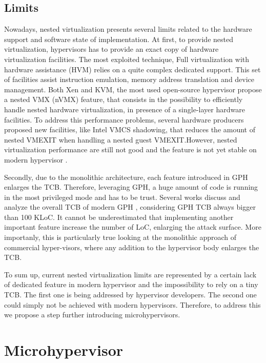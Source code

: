 \documentclass{acm_proc_article-sp} %
\begin{document}
\subsection{Limits}

Nowadays, nested virtualization presents several limits related to the hardware support and software state of implementation. At first, to provide nested virtualization, hypervisors has to provide an exact copy of hardware virtualization facilities. The most exploited technique, Full virtualization with hardware assistance (HVM) relies on a quite complex dedicated support.
This set of facilities assist instruction emulation, memory address translation and device management. Both Xen and KVM, the most used open-source hypervisor propose a nested VMX (nVMX) feature, that consists in the possibility to efficiently handle nested hardware virtualization, in presence of a single-layer hardware facilities.
To address this performance problems, several hardware producers proposed new facilities, like Intel VMCS shadowing, that reduces the amount of nested VMEXIT when handling a nested guest VMEXIT.However, nested virtualization performance are still not good and the feature is not yet stable on modern hypervisor \cite{xen:test}.

Secondly, due to the monolithic architecture, each feature introduced in GPH enlarges the TCB. Therefore, leveraging GPH, a huge amount of code is running in the most privileged mode and has to be trust. Several works discuss and analyze the overall TCB of modern GPH \cite{nova, xmhf}, considering GPH TCB always bigger than 100 KLoC. 
It cannot be underestimated that implementing another important feature increase the number of LoC, enlarging the attack surface. More importanly, this is particularly true looking at the monolithic approach of commercial hyper-visors, where any addition to the hypervisor body enlarges the TCB.

To sum up, current nested virtualization limits are represented by a certain lack of dedicated feature in modern hypervisor and the impossibility to rely on a tiny TCB.
The first one is being addressed by hypervisor developers. The second one could simply not be achieved with modern hypervisors. 
Therefore, to address this we propose a step further introducing microhypervisors.

\section{Microhypervisor}
\end{document}
